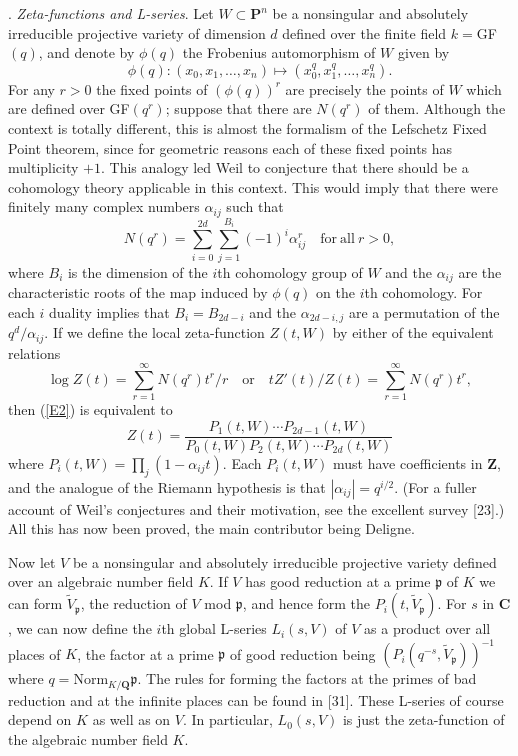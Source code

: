 \documentclass[12pt]{article}
\def\bC{{\mathbf C}}
\def\bP{{\mathbf P}}
\def\bQ{{\mathbf Q}}
\def\bZ{{\mathbf Z}}
\def\fp{{\mathfrak p}}
\def\ga{{\alpha}}
\def\beq{\begin{equation} \label}
\begin{document}
. \emph{Zeta-functions and L-series}. \newline
Let $W\subset\bP^n$ be a nonsingular and absolutely irreducible projective
variety of dimension $d$ defined over the finite field $k=$GF$(q)$,
and denote by $\phi(q)$ the Frobenius automorphism of $W$ given by
\[ \phi(q): (x_0,x_1,\ldots,x_n)\mapsto(x_0^q,x_1^q,\ldots,x_n^q). \]
For any $r>0$ the fixed points of $(\phi(q))^r$ are precisely the points of
$W$ which are defined over GF$(q^r)$; suppose that there are $N(q^r)$ of them.
Although the context is totally different, this is almost the formalism of the
Lefschetz Fixed Point theorem, since for geometric reasons each of these fixed
points has multiplicity $+1$. This analogy led Weil to conjecture that there
should be a cohomology theory applicable in this context. This would
imply that there were finitely many complex numbers $\ga_{ij}$ such that
\beq{E2} N(q^r)=\sum_{i=0}^{2d}\sum_{j=1}^{B_i}(-1)^i\ga_{ij}^r \quad
{\mathrm{for~all~}} r>0, \end{equation}
where $B_i$ is the dimension of the $i$th cohomology group of $W$ and the
$\ga_{ij}$ are the characteristic roots of the map induced by $\phi(q)$ on
the $i$th cohomology. For each $i$ duality
implies that $B_i=B_{2d-i}$ and the $\ga_{2d-i,j}$
are a permutation of the $q^d/\ga_{ij}$. If we define the local zeta-function
$Z(t,W)$ by either of the equivalent relations
\[ \log Z(t)=\sum_{r=1}^\infty N(q^r)t^r/r \quad {\mathrm{or}} \quad
tZ'(t)/Z(t)=\sum_{r=1}^\infty N(q^r)t^r, \]
then (\ref{E2}) is equivalent to
\[ Z(t)=\frac{P_1(t,W)\cdots P_{2d-1}(t,W)}
{P_0(t,W)P_2(t,W)\cdots P_{2d}(t,W)} \]
where $P_i(t,W)=\prod_j(1-\ga_{ij}t)$. Each $P_i(t,W)$ must have coefficients
in $\bZ$, and the analogue of the Riemann hypothesis is that $|\ga_{ij}|=
q^{i/2}$. (For a fuller account of Weil's conjectures and their motivation,
see the excellent survey [23].) All this has now been proved, the main
contributor being Deligne.

\medskip

Now let $V$ be a nonsingular and absolutely irreducible projective variety
defined over an algebraic number field $K$. If $V$ has good reduction at a
prime $\fp$ of $K$ we can form $\tilde{V}_\fp$, the reduction of $V$ mod $\fp$,
and hence form the $P_i(t,\tilde{V}_\fp)$. For $s$ in $\bC$, we can now define
the $i$th global L-series $L_i(s,V)$
of $V$ as a product over all places of $K$, the factor at a prime $\fp$ of
good reduction being $(P_i(q^{-s},\tilde{V}_\fp))^{-1}$ where
$q=$Norm$_{K/\bQ}\fp$. The
rules for forming the factors at the primes of bad reduction and at the
infinite places can be found in [31]. These L-series of course depend on $K$
as well as on $V$. In particular, $L_0(s,V)$
is just the zeta-function of the algebraic number field $K$.
\end{document}
